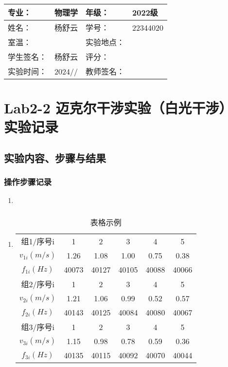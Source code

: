 \documentclass[dvipsnames, svgnames,a4paper,11pt]{article}
\begin{document}
	\clearpage
	
	\begin{table}
		\renewcommand\arraystretch{1.7}
		\centering
		\begin{tabularx}{\textwidth}{|X|X|X|X|}
			\hline
			专业： & 物理学 & 年级： & 2022级 \\
			\hline
			姓名： & 杨舒云 & 学号： & 22344020\\
			\hline
			室温： &  & 实验地点： &  \\
			\hline
			学生签名：& 杨舒云 & 评分： &\\
			\hline
			实验时间：& 2024// & 教师签名：&\\
			\hline
		\end{tabularx}
	\end{table}
	
	\section{Lab2-2 迈克尔干涉实验（白光干涉）  \quad\heiti 实验记录}
	
	\subsection{实验内容、步骤与结果}
	
	\subsubsection{操作步骤记录}
	\begin{enumerate}
		\item 
	\end{enumerate}	
	
	\subsubsection{}
	\begin{enumerate}
		\item \begin{table}[h]
			\centering
			\caption{表格示例}
			\label{tab:tab1}
			\begin{tabular}{|c|c|c|c|c|c|}
				\hline
				组1/序号i & 1 & 2 & 3 & 4 & 5 \\
				$v_{1i}(m/s)$ & 1.26 & 1.08 & 1.00 & 0.75 & 0.38 \\
				$f_{1i}(Hz)$ & 40073 & 40127 & 40105 & 40088 & 40066 \\
				\hline
				组2/序号i & 1 & 2 & 3 & 4 & 5 \\
				$v_{2i}(m/s)$ & 1.21 & 1.06 & 0.99 & 0.52 & 0.57 \\
				$f_{2i}(Hz)$ & 40143 & 40125 & 40084 & 40080 & 40067 \\
				\hline
				组3/序号i & 1 & 2 & 3 & 4 & 5 \\
				$v_{3i}(m/s)$ & 1.15 & 0.98 & 0.78 & 0.59 & 0.36 \\
				$f_{3i}(Hz)$ & 40135 & 40115 & 40092 & 40070 & 40044 \\
				\hline
			\end{tabular}
		\end{table}		
	\end{enumerate}
	
\end{document}
